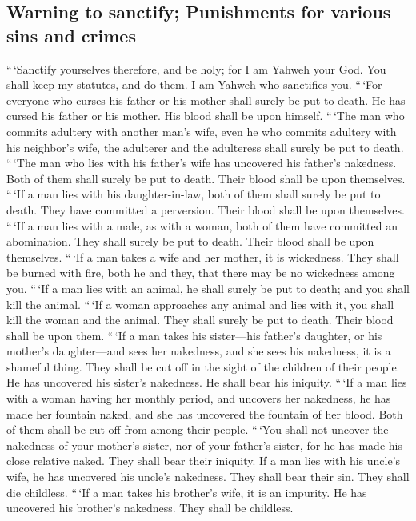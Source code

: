 \hypertarget{warning-to-sanctify-punishments-for-various-sins-and-crimes}{%
\subsection{Warning to sanctify; Punishments for various sins and
crimes}\label{warning-to-sanctify-punishments-for-various-sins-and-crimes}}

 ``\,`Sanctify yourselves therefore, and be holy; for I am
Yahweh your God.  You shall keep my statutes, and do them.
I am Yahweh who sanctifies you.  ``\,`For everyone who
curses his father or his mother shall surely be put to death. He has
cursed his father or his mother. His blood shall be upon himself.
 ``\,`The man who commits adultery with another man's
wife, even he who commits adultery with his neighbor's wife, the
adulterer and the adulteress shall surely be put to death.
 ``\,`The man who lies with his father's wife has
uncovered his father's nakedness. Both of them shall surely be put to
death. Their blood shall be upon themselves.  ``\,`If a
man lies with his daughter-in-law, both of them shall surely be put to
death. They have committed a perversion. Their blood shall be upon
themselves.  ``\,`If a man lies with a male, as with a
woman, both of them have committed an abomination. They shall surely be
put to death. Their blood shall be upon themselves. 
``\,`If a man takes a wife and her mother, it is wickedness. They shall
be burned with fire, both he and they, that there may be no wickedness
among you.  ``\,`If a man lies with an animal, he shall
surely be put to death; and you shall kill the animal. 
``\,`If a woman approaches any animal and lies with it, you shall kill
the woman and the animal. They shall surely be put to death. Their blood
shall be upon them.  ``\,`If a man takes his sister---his
father's daughter, or his mother's daughter---and sees her nakedness,
and she sees his nakedness, it is a shameful thing. They shall be cut
off in the sight of the children of their people. He has uncovered his
sister's nakedness. He shall bear his iniquity.  ``\,`If
a man lies with a woman having her monthly period, and uncovers her
nakedness, he has made her fountain naked, and she has uncovered the
fountain of her blood. Both of them shall be cut off from among their
people.  ``\,`You shall not uncover the nakedness of your
mother's sister, nor of your father's sister, for he has made his close
relative naked. They shall bear their iniquity.  If a man
lies with his uncle's wife, he has uncovered his uncle's nakedness. They
shall bear their sin. They shall die childless.  ``\,`If
a man takes his brother's wife, it is an impurity. He has uncovered his
brother's nakedness. They shall be childless.


